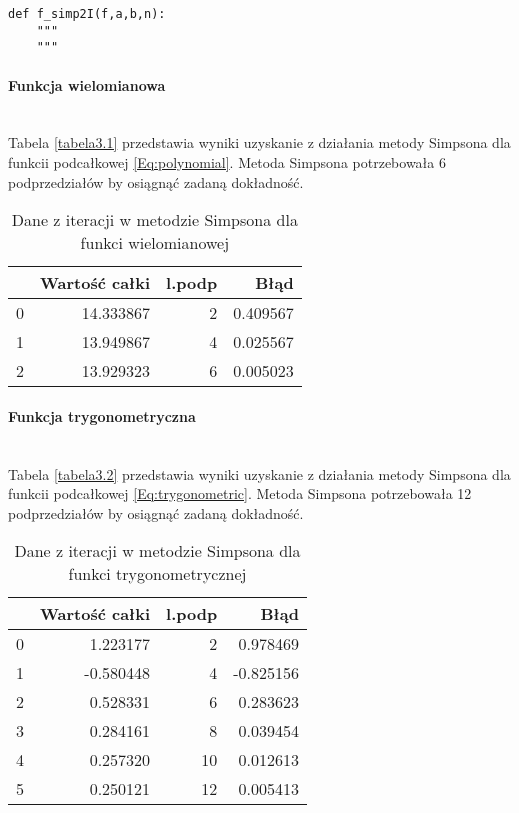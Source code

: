 \documentclass[12pt,twoside]{article}
\begin{document}
\begin{lstlisting}[caption={Kod w języku python implementujący metodę prostokątów}]
def f_simp2I(f,a,b,n):
    """
    """
\end{lstlisting}
\label{Listing 8}

\paragraph{Funkcja wielomianowa}\mbox{} \\

Tabela \eqref{tabela3.1} przedstawia wyniki uzyskanie z działania metody Simpsona dla funkcii podcałkowej \eqref{Eq:polynomial}. Metoda Simpsona potrzebowała 6 podprzedziałów by osiągnąć zadaną dokładność.

\begin{table}[H]
\centering 
\caption{Dane z iteracji w metodzie Simpsona dla funkci wielomianowej}
\label{tabela3.1}
\begin{tabular}{lrrr}
\toprule
{} &  Wartość całki &  l.podp &      Błąd \\
\midrule
0 &      14.333867 &       2 &  0.409567 \\
1 &      13.949867 &       4 &  0.025567 \\
2 &      13.929323 &       6 &  0.005023 \\
\bottomrule
\end{tabular}
\end{table}

\paragraph{Funkcja trygonometryczna}\mbox{} \\

Tabela \eqref{tabela3.2} przedstawia wyniki uzyskanie z działania metody Simpsona dla funkcii podcałkowej \eqref{Eq:trygonometric}. Metoda Simpsona potrzebowała 12 podprzedziałów by osiągnąć zadaną dokładność.

\begin{table}[H]
\centering
\caption{Dane z iteracji w metodzie Simpsona dla funkci trygonometrycznej}
\label{tabela3.2}
\begin{tabular}{lrrr}
\toprule
{} &  Wartość całki &  l.podp &      Błąd \\
\midrule
0 &       1.223177 &       2 &  0.978469 \\
1 &      -0.580448 &       4 & -0.825156 \\
2 &       0.528331 &       6 &  0.283623 \\
3 &       0.284161 &       8 &  0.039454 \\
4 &       0.257320 &      10 &  0.012613 \\
5 &       0.250121 &      12 &  0.005413 \\
\bottomrule
\end{tabular}
\end{table}
\end{document}
